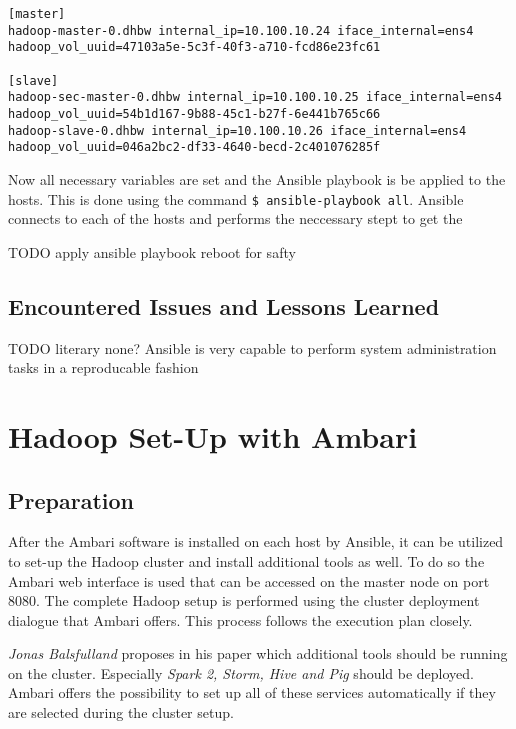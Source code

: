 \lstset{language=sh}
\begin{lstlisting}[caption={Inventory description in Ansible}, label={lst:inventory}]
[master]
hadoop-master-0.dhbw internal_ip=10.100.10.24 iface_internal=ens4 hadoop_vol_uuid=47103a5e-5c3f-40f3-a710-fcd86e23fc61

[slave]
hadoop-sec-master-0.dhbw internal_ip=10.100.10.25 iface_internal=ens4 hadoop_vol_uuid=54b1d167-9b88-45c1-b27f-6e441b765c66
hadoop-slave-0.dhbw internal_ip=10.100.10.26 iface_internal=ens4 hadoop_vol_uuid=046a2bc2-df33-4640-becd-2c401076285f
\end{lstlisting}


Now all necessary variables are set and the Ansible playbook is be applied to the hosts.
This is done using the command \texttt{\$ ansible-playbook all}.
Ansible connects to each of the hosts and performs the neccessary stept to get the 


TODO apply ansible playbook
reboot for safty

\subsection{Encountered Issues and Lessons Learned}

TODO
literary none?
Ansible is very capable to perform system administration tasks in a reproducable fashion

\section{Hadoop Set-Up with Ambari}

\subsection{Preparation}

After the Ambari software is installed on each host by Ansible, it can be utilized to set-up the Hadoop cluster and install additional tools as well.
To do so the Ambari web interface is used that can be accessed on the master node on port 8080. The complete Hadoop setup is performed using the cluster deployment dialogue that Ambari offers. This process follows the execution plan closely.

\emph{Jonas Balsfulland} proposes in his paper which additional tools should be running on the cluster. Especially \emph{Spark 2, Storm, Hive and Pig} should be deployed.
Ambari offers the possibility to set up all of these services automatically if they are selected during the cluster setup.

